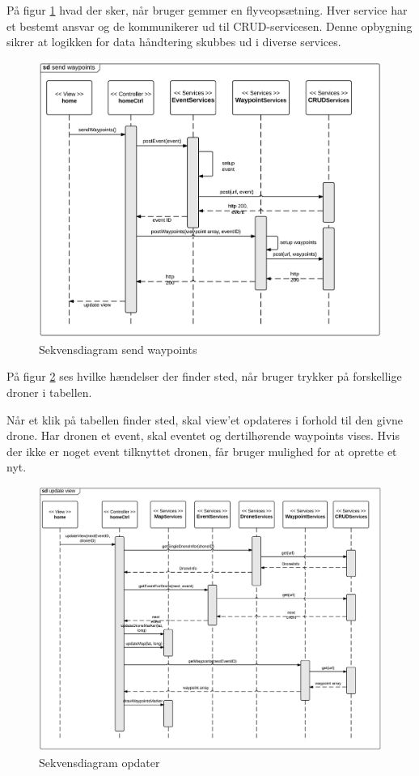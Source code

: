 \newpage
På figur \ref{fig:send_waypoints} hvad der sker, når bruger gemmer en flyveopsætning. Hver service har et bestemt ansvar og de kommunikerer ud til CRUD-servicesen. Denne opbygning sikrer at logikken for data håndtering skubbes ud i diverse services. 
\begin{figure}[H]
	\centering
	\includegraphics[width=1\textwidth]{Billeder/sekvens/sd_send_waypoints.png}
	\caption{Sekvensdiagram send waypoints}
	\label{fig:send_waypoints}
\end{figure}

\newpage
På figur \ref{fig:update_view} ses hvilke hændelser der finder sted, når bruger trykker på forskellige droner i tabellen. 

Når et klik på tabellen finder sted, skal view'et opdateres i forhold til den givne drone. Har dronen et event, skal eventet og dertilhørende waypoints vises. Hvis der ikke er noget event tilknyttet dronen, får bruger mulighed for at oprette et nyt.
\begin{figure}[H]
	\centering
	\includegraphics[width=1\textwidth]{Billeder/sekvens/sd_update_view.png}
	\caption{Sekvensdiagram opdater }
	\label{fig:update_view}
\end{figure}

